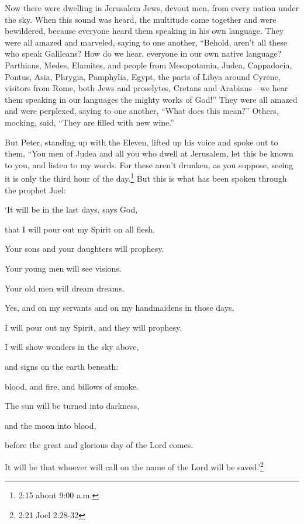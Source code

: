 \myverse{}Now there were dwelling in Jerusalem Jews, devout men, from every
nation under the sky.
\myverse{}When this sound was heard, the multitude came together and were bewildered,
because everyone heard them speaking in his own language.
\myverse{}They were all amazed and marveled, saying to one another, “Behold, aren’t all
these who speak Galileans?
\myverse{}How do we hear, everyone in our own native language?
\myverse{}Parthians, Medes, Elamites, and people from Mesopotamia, Judea, Cappadocia,
Pontus, Asia,
\myverse{}Phrygia, Pamphylia, Egypt, the parts of Libya around Cyrene, visitors from
Rome, both Jews and proselytes,
\myverse{}Cretans and Arabians—we hear them speaking in our languages the mighty works
of God!”
\myverse{}They were all amazed and were perplexed, saying to one another, “What does
this mean?”
\myverse{}Others, mocking, said, “They are filled with new wine.”

\myverse{}But Peter, standing up with the Eleven, lifted up his voice and
spoke out to them, “You men of Judea and all you who dwell at Jerusalem, let this be known to you, and
listen to my words.
\myverse{}For these aren’t drunken, as you suppose, seeing it is only the third hour
of the day.\footnote{2:15 about 9:00 a.m.}
\myverse{}But this is what has been spoken through the prophet Joel:

\myverse{}‘It will be in the last days, says God,

that I will pour out my Spirit on all flesh.

Your sons and your daughters will prophesy.

Your young men will see visions.

Your old men will dream dreams.

\myverse{}Yes, and on my servants and on my handmaidens in those days,

I will pour out my Spirit, and they will prophesy.

\myverse{}I will show wonders in the sky above,

and signs on the earth beneath:

blood, and fire, and billows of smoke.

\myverse{}The sun will be turned into darkness,

and the moon into blood,

before the great and glorious day of the Lord comes.

\myverse{}It will be that whoever will call on the name of the Lord will
be saved.’\footnote{2:21 Joel 2:28-32}

